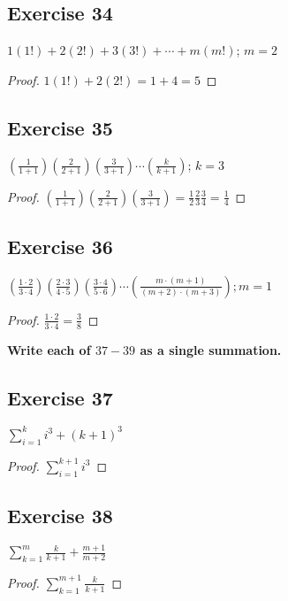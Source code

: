 \documentclass[14pt]{extarticle}
\newcommand{\dps}{\displaystyle}
\newcommand{\cy}{\color{cyan}}
\begin{document}
\subsection{Exercise 34}
$\dps 1(1!) + 2(2!) + 3(3!) + \cdots + m(m!)$; $m = 2$

\begin{proof}
    $\dps 1(1!) + 2(2!) = 1 + 4 = 5$
\end{proof}

\subsection{Exercise 35}
$\dps \left(\frac{1}{1+1}\right)\left(\frac{2}{2+1}\right)\left(\frac{3}{3+1}\right) \cdots \left(\frac{k}{k+1}\right)$; $k = 3$

\begin{proof}
    $\dps \left(\frac{1}{1+1}\right)\left(\frac{2}{2+1}\right)\left(\frac{3}{3+1}\right) = \frac{1}{2}\frac{2}{3}\frac{3}{4} = \frac{1}{4}$
\end{proof}

\subsection{Exercise 36}
$\dps \left(\frac{1\cdot2}{3\cdot4}\right)\left(\frac{2\cdot3}{4\cdot5}\right)\left(\frac{3\cdot4}{5\cdot6}\right)\cdots\left(\frac{m\cdot(m+1)}{(m+2)\cdot(m+3)}\right); m = 1$

\begin{proof}
    $\dps \frac{1\cdot2}{3\cdot4} = \frac{3}{8}$
\end{proof}

{\bf\cy Write each of $37-39$ as a single summation.}

\subsection{Exercise 37}
$\dps\sum_{i=1}^{k}i^3 + (k+1)^3$

\begin{proof}
    $\dps\sum_{i=1}^{k+1}i^3$
\end{proof}

\subsection{Exercise 38}
$\dps\sum_{k=1}^{m}\frac{k}{k+1} + \frac{m+1}{m+2}$

\begin{proof}
    $\dps\sum_{k=1}^{m+1}\frac{k}{k+1}$
\end{proof}
\end{document}
